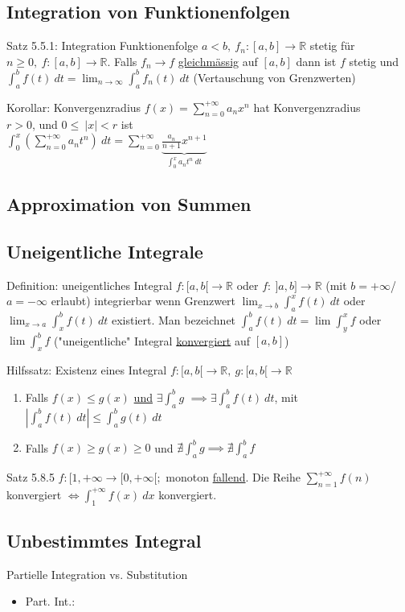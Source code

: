 \documentclass[a4paper,10pt]{article}
\begin{document}
\subsection{Integration von Funktionenfolgen}
\begin{tbox}
    {Satz 5.5.1:  Integration Funktionenfolge}
    $a<b,\ f_n:[a,b]\longrightarrow\mathbb R$ stetig für $n\ge 0,\ f:[a,b]\longrightarrow \mathbb R$. Falls $f_n\longrightarrow f$ \underline{gleichmässig} auf $[a,b]$ dann ist $f$ stetig und $\int_a^b f(t)\ dt=\lim_{n\to\infty}\int_a^b f_n(t)\ dt$ (Vertauschung von Grenzwerten)
\end{tbox}
\begin{tbox}
    {Korollar: Konvergenzradius}
    $f(x)=\sum_{n=0}^{+\infty}a_nx^n$ hat Konvergenzradius 
    \\ $r>0$, und $0\le\ |x|<r$ ist 
    \\ $\int_0^x(\sum_{n=0}^{+\infty}a_nt^n)\ dt = \sum_{n=0}^{+\infty}\underbrace{\frac {a_n}{n+1}x^{n+1}}_{\int_0^xa_nt^n\ dt}$
\end{tbox}
\subsection{Approximation von Summen}
\subsection{Uneigentliche Integrale}
\begin{defbox}
    {Definition: uneigentliches Integral}
    $f:[a,b[\longrightarrow\mathbb R$ oder $f:\ ]a,b]\longrightarrow\mathbb R$ (mit $b=+\infty$/$a=-\infty$ erlaubt) integrierbar wenn Grenzwert $\lim_{x\to b}\int_a^x f(t)\ dt$ oder $\lim_{x\to a}\int_x^b f(t)\ dt$ existiert.
    Man bezeichnet $\int_a^b f(t)\ dt =\lim \int_y^x f$ oder $\lim\int_x^b f$ ("uneigentliche" Integral \underline{konvergiert} auf $[a,b]$)
\end{defbox}
\begin{tbox}
    {Hilfssatz: Existenz eines Integral}
    $f:[a,b[\longrightarrow\mathbb R,\ g:[a,b[\longrightarrow\mathbb R$
    \begin{enumerate}
        \item Falls $f(x)\le g(x)$ \underline{und} $\exists \int_a^b g$ $\implies \exists\int_a^b f(t)\ dt$, mit $|\int_a^b f(t)\ dt|\le \int_a^b g(t)\ dt$
        \item Falls $f(x)\ge g(x)\ge 0$ und $\nexists \int_a^b g \implies \nexists \int_a^b f$
    \end{enumerate}
\end{tbox}
\begin{tbox}
    {Satz 5.8.5}
    $f:[1,+\infty\longrightarrow[0,+\infty[;$ monoton \underline{fallend}. Die Reihe $\sum_{n=1}^{+\infty} f(n)$ konvergiert $\iff \int_1^{+\infty} f(x)\ dx$ konvergiert.
\end{tbox}
\subsection{Unbestimmtes Integral}
\begin{defbox}
    {Partielle Integration vs. Substitution}
    \begin{itemize}
        \item Part. Int.: 
    \end{itemize}
\end{defbox}
\end{document}
